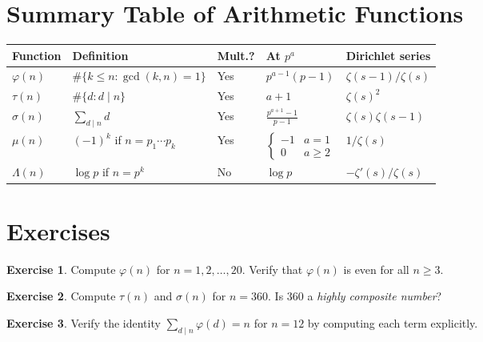 \documentclass[12pt,a4paper,openany]{book}
\theoremstyle{definition}
\newtheorem{exercise}{Exercise}[chapter]
\theoremstyle{plain}
\theoremstyle{remark}
\begin{document}
\section{Summary Table of Arithmetic Functions}\label{sec:arith-table}

\begin{center}
\begin{tabular}{@{}lllll@{}}
\toprule
\textbf{Function} & \textbf{Definition} & \textbf{Mult.?}
  & \textbf{At $p^a$} & \textbf{Dirichlet series} \\
\midrule
$\varphi(n)$ & $\#\{k \le n : \gcd(k,n)=1\}$
  & Yes & $p^{a-1}(p-1)$ & $\zeta(s-1)/\zeta(s)$ \\[3pt]
$\tau(n)$    & $\#\{d : d\mid n\}$
  & Yes & $a+1$ & $\zeta(s)^2$ \\[3pt]
$\sigma(n)$  & $\sum_{d\mid n}d$
  & Yes & $\frac{p^{a+1}-1}{p-1}$ & $\zeta(s)\zeta(s-1)$ \\[3pt]
$\mu(n)$     & $(-1)^k$ if $n=p_1\cdots p_k$
  & Yes & $\begin{cases}-1&a=1\\0&a\ge 2\end{cases}$ & $1/\zeta(s)$ \\[3pt]
$\Lambda(n)$ & $\log p$ if $n=p^k$
  & No  & $\log p$ & $-\zeta'(s)/\zeta(s)$ \\
\bottomrule
\end{tabular}
\label{tab:arith-funcs}
\end{center}

\section{Exercises}\label{sec:ch8-exercises}

\begin{exercise}\label{exer:phi-values}
Compute $\varphi(n)$ for $n = 1, 2, \ldots, 20$.  Verify that $\varphi(n)$
is even for all $n \ge 3$.
\end{exercise}

\begin{exercise}\label{exer:tau-sigma-mult}
Compute $\tau(n)$ and $\sigma(n)$ for $n = 360$.  Is $360$ a
\emph{highly composite number}?
\end{exercise}

\begin{exercise}\label{exer:phi-divisor-sum-verify}
Verify the identity $\sum_{d\mid n}\varphi(d) = n$ for $n = 12$ by computing
each term explicitly.
\end{exercise}
\end{document}
